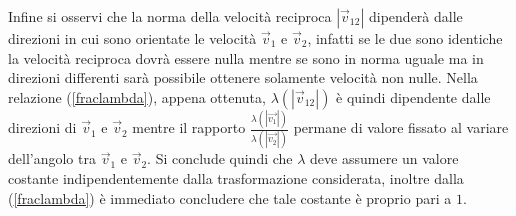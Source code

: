 Infine si osservi che la norma della velocità reciproca $|\vec{v}_{12}|$ dipenderà dalle direzioni in cui sono orientate le velocità $\vec{v}_1$ e $\vec{v}_2$, infatti se le due sono identiche la velocità reciproca dovrà essere nulla mentre se sono in norma uguale ma in direzioni differenti sarà possibile ottenere solamente velocità non nulle. Nella relazione (\ref{fraclambda}), appena ottenuta, $\lambda(|\vec{v}_{12}|)$ è quindi dipendente dalle direzioni di $\vec{v}_1$ e $\vec{v}_2$ mentre il rapporto $\frac{\lambda(|\vec{v_1}|)}{\lambda(|\vec{v_2}|)}$ permane di valore fissato al variare dell'angolo tra $\vec{v}_1$ e $\vec{v}_2$. Si conclude quindi che $\lambda$ deve assumere un valore costante indipendentemente dalla trasformazione considerata, inoltre dalla (\ref{fraclambda}) è immediato concludere che tale costante è proprio pari a $1$.\\

